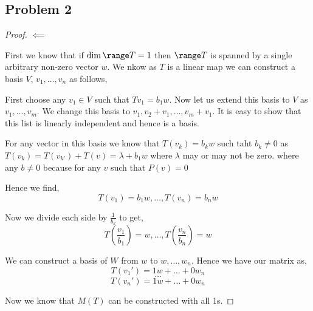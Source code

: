 \documentclass[a4paper]{report}
\begin{document}
\subsection*{Problem 2}
\begin{proof}
    $\impliedby$ 

    First we know that if $\dim \range T = 1$ then  $\range T$ is spanned by a single arbitrary non-zero vector $w$. We nkow as $T$ is a linear map we can construct a basis $V$, $v_1,\dots,v_n$ as follows,


    First choose any $v_1 \in V$ such that $Tv_1 = b_1w$. Now let us extend this basis to $V$ as $v_1,\dots,v_m$. We change this basis to $v_1,v_2+v_1,\dots,v_m+v_1$. It is easy to show that this list is linearly independent and hence is a basis.
    
    For any vector in this basis we know that $T(v_k) = b_kw$ such taht $b_k \ne 0$ as $T(v_k) = T(v_{k'}) + T(v) = \lambda + b_1w$ where $\lambda$ may or may not be zero.
    where any $b \ne 0$ because for any $v$ such that $P(v) = 0$

    Hence we find, 
    $$ T(v_1) = b_1w,\dots,T(v_n) = b_nw $$

    Now we divide each side by $\frac{1}{b_k}$ to get, 
    $$ T(\frac{v_1}{b_1})= w,\dots,T(\frac{v_n}{b_n}) = w $$ 

    We can construct a basis of $W$ from $w$ to $w,\dots,w_n$. Hence we have our matrix as,  
    $$ T(v_1') = 1w + \dots + 0w_n $$ 
    $$ \dots$$
    $$ T(v_n') = 1w + \dots + 0w_n $$ 

    Now we know that $M(T)$ can be constructed with all 1s.
\end{proof}
\end{document}
